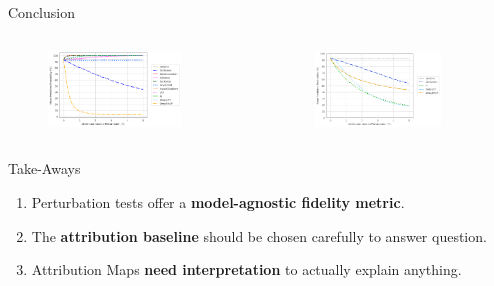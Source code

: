\documentclass[aspectratio=169,xcolor={table, dvipsnames}]{beamer}
\renewcommand{\emph}[1]{\textbf{#1}}
\begin{document}
\begin{frame}{Conclusion}
	\begin{columns}
		\begin{column}{0.5\textwidth}
			\begin{figure}
				\centering
				\includegraphics[width=0.8\textwidth]{figures/3672-ad-fidelity-null.png}
			\end{figure}
		\end{column}\hfill
		\begin{column}{0.5\textwidth}
			\begin{figure}
				\centering
				\includegraphics[width=0.8\textwidth]{figures/3672-ad-fidelity-cn2.png}
			\end{figure}
		\end{column}
	\end{columns}
	\begin{block}{Take-Aways}
		\begin{enumerate}
			\item<2-> Perturbation tests offer a \emph{model-agnostic fidelity metric}.
			\item<3-> The \emph{attribution baseline} should be chosen carefully to answer question.
			\item<4-> Attribution Maps \emph{need interpretation} to actually explain anything.
		\end{enumerate}
	\end{block}

\end{frame}
\end{document}
